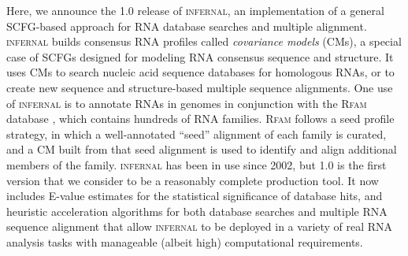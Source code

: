 Here, we announce the 1.0 release of \textsc{infernal}, an
implementation of a general SCFG-based approach for RNA database
searches and multiple alignment. \textsc{infernal} builds consensus
RNA profiles called \emph{covariance models} (CMs), a special case of
SCFGs designed for modeling RNA consensus sequence and structure. It
uses CMs to search nucleic acid sequence databases for homologous
RNAs, or to create new sequence and structure-based multiple sequence
alignments. One use of \textsc{infernal} is to annotate RNAs in
genomes in conjunction with the \textsc{Rfam} database
\citep{Gardner09}, which contains hundreds of RNA families.
\textsc{Rfam} follows a seed profile strategy, in which a
well-annotated ``seed'' alignment of each family is curated, and a CM
built from that seed alignment is used to identify and align
additional members of the family.  \textsc{infernal} has been in use
since 2002, but 1.0 is the first version that we consider to be a
reasonably complete production tool. It now includes E-value estimates
for the statistical significance of database hits, and heuristic
acceleration algorithms for both database searches and multiple RNA
sequence alignment that allow \textsc{infernal} to be deployed in a
variety of real RNA analysis tasks with manageable (albeit high)
computational requirements.


